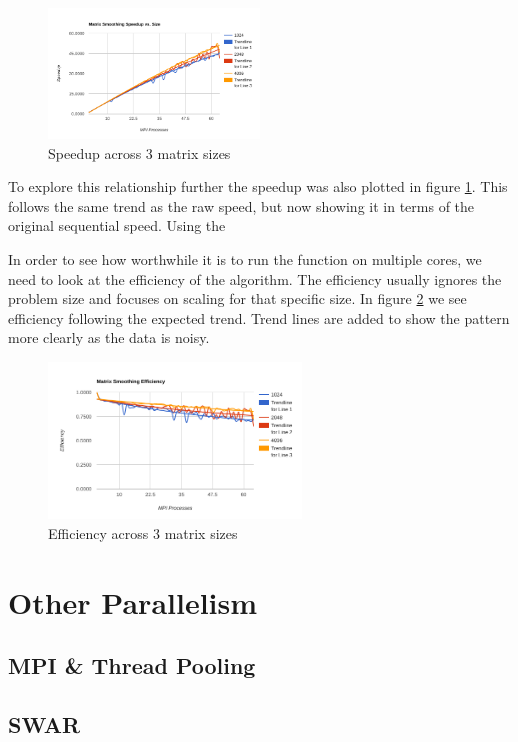 \documentclass[a4paper,10pt]{report}
\begin{document}
\begin{figure}
 \centering
 \includegraphics[width=0.5\textwidth]{./images/sizes-speedup.png}
 \caption{Speedup across 3 matrix sizes}
 \label{fig:sizespeedup}
\end{figure}

To explore this relationship further the speedup was also plotted in figure \ref{fig:sizespeedup}. This follows the same trend as the raw speed, but now showing it in terms of the original sequential speed. Using the 





In order to see how worthwhile it is to run the function on multiple cores, we need to look at the efficiency of the algorithm. The efficiency usually ignores the problem size and focuses on scaling for that specific size. In figure \ref{fig:sizesefficiency} we see efficiency following the expected trend. Trend lines are added to show the pattern more clearly as the data is noisy.

\begin{figure}
 \centering
 \includegraphics[width=0.6\textwidth]{./images/sizes-efficiency.png}
 \caption{Efficiency across 3 matrix sizes}
 \label{fig:sizesefficiency}
\end{figure}






\section{Other Parallelism}
\subsection{MPI \& Thread Pooling}
\subsection{SWAR}
\end{document}
